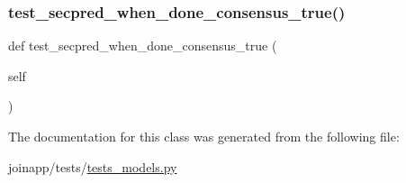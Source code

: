 \subsubsection{\texorpdfstring{test\_secpred\_when\_done\_consensus\_true()}{test\_secpred\_when\_done\_consensus\_true()}}
{\footnotesize\ttfamily def test\+\_\+secpred\+\_\+when\+\_\+done\+\_\+consensus\+\_\+true (\begin{DoxyParamCaption}\item[{}]{self }\end{DoxyParamCaption})}



The documentation for this class was generated from the following file\+:\begin{DoxyCompactItemize}
\item 
joinapp/tests/\mbox{\hyperlink{tests__models_8py}{tests\+\_\+models.\+py}}\end{DoxyCompactItemize}
